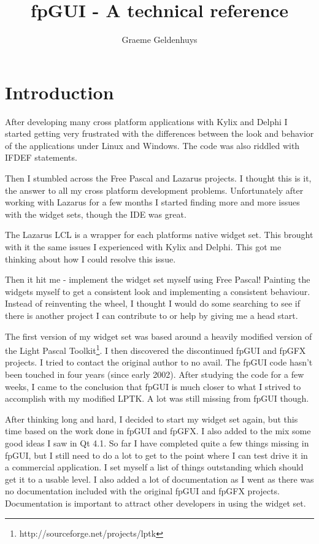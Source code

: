 \documentclass[a4paper,11pt]{report}
\author{Graeme Geldenhuys}
\title{fpGUI - A technical reference}
\begin{document}
\maketitle
\newpage

\tableofcontents
\newpage

\chapter{Introduction}
After developing many cross platform applications with Kylix and Delphi
I started getting very frustrated with the differences between the look and
behavior of the applications under Linux and Windows.  The code was also
riddled with IFDEF statements.

Then I stumbled across the Free Pascal and Lazarus projects. I thought this 
is it, the answer to all my cross platform development problems. Unfortunately
after working with Lazarus for a few months I started finding more and more
issues with the widget sets, though the IDE was great.

The Lazarus LCL is a wrapper for each platforms native widget set. This 
brought with it the same issues I experienced with Kylix and Delphi. This got
me thinking about how I could resolve this issue.

Then it hit me - implement the widget set myself using Free Pascal! Painting
the widgets myself to get a consistent look and implementing a consistent
behaviour. Instead of reinventing the wheel, I thought I would do some searching
to see if there is another project I can contribute to or help by giving me
a head start.

The first version of my widget set was based around a heavily modified version
of the Light Pascal Toolkit\footnote{http://sourceforge.net/projects/lptk}. 
I then discovered the discontinued fpGUI and fpGFX projects. I tried 
to contact the original author to no avail. The fpGUI code hasn't been 
touched in four years (since early 2002). After studying the code for a 
few weeks, I came to the conclusion that fpGUI is much closer to what I strived 
to accomplish with my modified LPTK. A lot was still missing from fpGUI though.

After thinking long and hard, I decided to start my widget set again, but 
this time based on the work done in fpGUI and fpGFX. I also added to the 
mix some good ideas I saw in Qt 4.1. So far I have completed quite a few things 
missing in fpGUI, but I still need to do a lot to get to the point where I 
can test drive it in a commercial application. I set myself a list of 
things outstanding which should get it to a usable level. I also added a 
lot of documentation as I went as there was no documentation included with 
the original fpGUI and fpGFX projects. Documentation is important 
to attract other developers in using the widget set.
\end{document}
